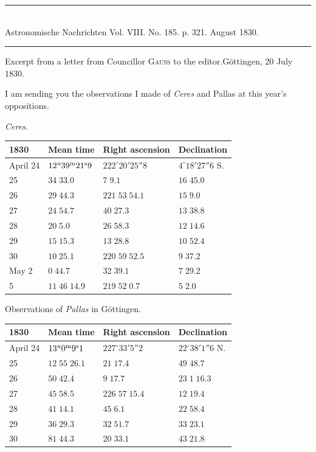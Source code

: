 \clearpage
{}
\hypertarget{native-467-letter}{}
\begin{center}
\rule{0.55\linewidth}{0.4pt}\\[2pt]
Astronomische Nachrichten Vol. VIII. No. 185. p. 321. August 1830.\\[2pt]
\rule{0.55\linewidth}{0.4pt}
\end{center}

\begin{center}Excerpt from a letter from Councillor \textsc{Gauss} to the editor.\quad Göttingen, 20 July 1830.\end{center}

I am sending you the observations I made of \emph{Ceres} and Pallas at this year’s oppositions.

\begin{center}
\emph{Ceres.}

\begin{tabular}{l|l|l|l}
1830 & Mean time & Right ascension & Declination \\
\hline
April 24 & $12^{\rm u}39^{\rm m}21^{\rm s}9$ & $222^\circ20'25''8$ & $4^\circ18'27''6$ S. \\
\hfill 25 & $34\;33.0$ & $7\;9.1$ & $16\;45.0$ \\
\hfill 26 & $29\;44.3$ & $221\;53\;54.1$ & $15\;9.0$ \\
\hfill 27 & $24\;54.7$ & $40\;27.3$ & $13\;38.8$ \\
\hfill 28 & $20\;5.0$ & $26\;58.3$ & $12\;14.6$ \\
\hfill 29 & $15\;15.3$ & $13\;28.8$ & $10\;52.4$ \\
\hfill 30 & $10\;25.1$ & $220\;59\;52.5$ & $9\;37.2$ \\
May 2 & $0\;44.7$ & $32\;39.1$ & $7\;29.2$ \\
\hfill 5 & $11\;46\;14.9$ & $219\;52\;0.7$ & $5\;2.0$ \\
\end{tabular}
\end{center}

\begin{center}
Observations of \emph{Pallas} in Göttingen.

\begin{tabular}{l|l|l|l}
1830 & Mean time & Right ascension & Declination \\
\hline
April 24 & $13^{\rm u}0^{\rm m}9^{\rm s}1$ & $227^\circ33'5''2$ & $22^\circ38'1''6$ N. \\
\hfill 25 & $12\;55\;26.1$ & $21\;17.4$ & $49\;48.7$ \\
\hfill 26 & $50\;42.4$ & $9\;17.7$ & $23\;1\;16.3$ \\
\hfill 27 & $45\;58.5$ & $226\;57\;15.4$ & $12\;19.4$ \\
\hfill 28 & $41\;14.1$ & $45\;6.1$ & $22\;58.4$ \\
\hfill 29 & $36\;29.3$ & $32\;51.7$ & $33\;23.1$ \\
\hfill 30 & $81\;44.3$ & $20\;33.1$ & $43\;21.8$ \\
\end{tabular}
\end{center}

